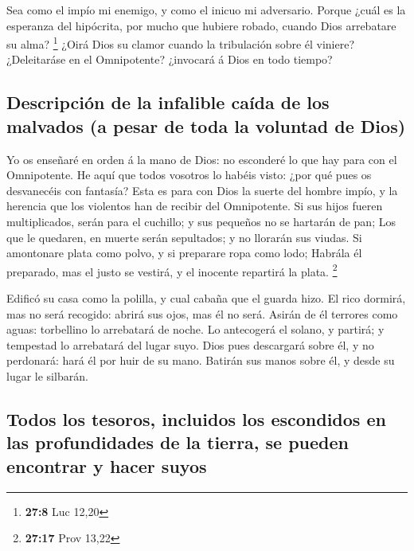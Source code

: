  Sea como el impío mi enemigo, y como el inicuo mi
adversario.  Porque ¿cuál es la esperanza del hipócrita, por
mucho que hubiere robado, cuando Dios arrebatare su alma? \footnote{\textbf{27:8}
  Luc 12,20}  ¿Oirá Dios su clamor cuando la tribulación
sobre él viniere?  ¿Deleitaráse en el Omnipotente?
¿invocará á Dios en todo tiempo?

\hypertarget{descripciuxf3n-de-la-infalible-cauxedda-de-los-malvados-a-pesar-de-toda-la-voluntad-de-dios}{%
\subsection{Descripción de la infalible caída de los malvados (a pesar
de toda la voluntad de
Dios)}\label{descripciuxf3n-de-la-infalible-cauxedda-de-los-malvados-a-pesar-de-toda-la-voluntad-de-dios}}

 Yo os enseñaré en orden á la mano de Dios: no esconderé lo
que hay para con el Omnipotente.  He aquí que todos
vosotros lo habéis visto: ¿por qué pues os desvanecéis con fantasía?
 Esta es para con Dios la suerte del hombre impío, y la
herencia que los violentos han de recibir del Omnipotente. 
Si sus hijos fueren multiplicados, serán para el cuchillo; y sus
pequeños no se hartarán de pan;  Los que le quedaren, en
muerte serán sepultados; y no llorarán sus viudas.  Si
amontonare plata como polvo, y si preparare ropa como lodo;
 Habrála él preparado, mas el justo se vestirá, y el
inocente repartirá la plata. \footnote{\textbf{27:17} Prov 13,22}

 Edificó su casa como la polilla, y cual cabaña que el
guarda hizo.  El rico dormirá, mas no será recogido: abrirá
sus ojos, mas él no será.  Asirán de él terrores como
aguas: torbellino lo arrebatará de noche.  Lo antecogerá el
solano, y partirá; y tempestad lo arrebatará del lugar suyo.
 Dios pues descargará sobre él, y no perdonará: hará él por
huir de su mano.  Batirán sus manos sobre él, y desde su
lugar le silbarán.

\hypertarget{todos-los-tesoros-incluidos-los-escondidos-en-las-profundidades-de-la-tierra-se-pueden-encontrar-y-hacer-suyos}{%
\subsection{Todos los tesoros, incluidos los escondidos en las
profundidades de la tierra, se pueden encontrar y hacer
suyos}\label{todos-los-tesoros-incluidos-los-escondidos-en-las-profundidades-de-la-tierra-se-pueden-encontrar-y-hacer-suyos}}

